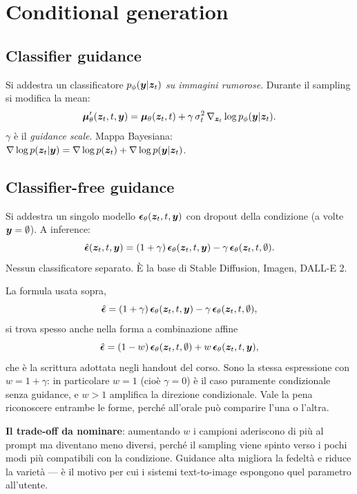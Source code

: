 \section{Conditional generation}

\subsection{Classifier guidance}
Si addestra un classificatore $p_\phi(\bm{y}|\bm{z}_t)$ \emph{su immagini rumorose}. Durante il sampling si modifica la mean:
\[
\boldsymbol{\mu}_\theta'(\bm{z}_t, t, \bm{y}) = \boldsymbol{\mu}_\theta(\bm{z}_t, t) + \gamma\, \sigma_t^2\, \nabla_{\bm{z}_t} \log p_\phi(\bm{y}|\bm{z}_t).
\]
$\gamma$ è il \emph{guidance scale}. Mappa Bayesiana: $\nabla\log p(\bm{z}_t|\bm{y}) = \nabla\log p(\bm{z}_t) + \nabla\log p(\bm{y}|\bm{z}_t)$.

\subsection{Classifier-free guidance}
Si addestra un singolo modello $\boldsymbol{\epsilon}_\theta(\bm{z}_t, t, \bm{y})$ con dropout della condizione (a volte $\bm{y} = \emptyset$). A inference:
\[
\hat{\boldsymbol{\epsilon}}(\bm{z}_t, t, \bm{y}) = (1+\gamma)\,\boldsymbol{\epsilon}_\theta(\bm{z}_t,t,\bm{y}) - \gamma\, \boldsymbol{\epsilon}_\theta(\bm{z}_t, t, \emptyset).
\]
Nessun classificatore separato. È la base di Stable Diffusion, Imagen, DALL-E 2.

\begin{remark}
La formula usata sopra,
\[
\hat{\boldsymbol{\epsilon}} = (1+\gamma)\,\boldsymbol{\epsilon}_\theta(\bm{z}_t, t, \bm{y}) - \gamma\, \boldsymbol{\epsilon}_\theta(\bm{z}_t, t, \emptyset),
\]
si trova spesso anche nella forma a combinazione affine
\[
\hat{\boldsymbol{\epsilon}} = (1 - w)\,\boldsymbol{\epsilon}_\theta(\bm{z}_t, t, \emptyset) + w\, \boldsymbol{\epsilon}_\theta(\bm{z}_t, t, \bm{y}),
\]
che è la scrittura adottata negli handout del corso. Sono la stessa espressione con $w = 1 + \gamma$: in particolare $w = 1$ (cioè $\gamma = 0$) è il caso puramente condizionale senza guidance, e $w > 1$ amplifica la direzione condizionale. Vale la pena riconoscere entrambe le forme, perché all'orale può comparire l'una o l'altra.

\textbf{Il trade-off da nominare}: aumentando $w$ i campioni aderiscono di più al prompt ma diventano meno diversi, perché il sampling viene spinto verso i pochi modi più compatibili con la condizione. Guidance alta migliora la fedeltà e riduce la varietà — è il motivo per cui i sistemi text-to-image espongono quel parametro all'utente.
\end{remark}

